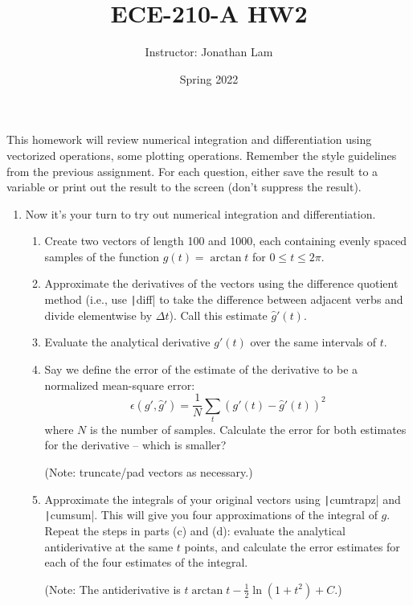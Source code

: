 \documentclass{article}
\title{ECE-210-A HW2}
\author{Instructor: Jonathan Lam}
\date{Spring 2022}
\begin{document}
\maketitle

\noindent This homework will review numerical integration and differentiation using vectorized operations, some plotting operations. Remember the style guidelines from the previous assignment. For each question, either save the result to a variable or print out the result to the screen (don't suppress the result).

\begin{enumerate}
\item
  Now it's your turn to try out numerical integration and differentiation.
  \begin{enumerate}
  \item Create two vectors of length 100 and 1000, each containing evenly spaced samples of the function $g(t)=\arctan t$ for $0\le t\le 2\pi$.
    
  \item Approximate the derivatives of the vectors using the difference quotient method (i.e., use \texttt|diff| to take the difference between adjacent verbs and divide elementwise by $\Delta t$). Call this estimate $\hat{g}'(t)$.
    
  \item Evaluate the analytical derivative $g'(t)$ over the same intervals of $t$.
    
  \item Say we define the error of the estimate of the derivative to be a normalized mean-square error:
    \begin{equation*}
      \epsilon(g',\hat{g}')=\frac{1}{N}\sum_{t} (g'(t)-\hat{g}'(t))^2
    \end{equation*}
    where $N$ is the number of samples. Calculate the error for both estimates for the derivative -- which is smaller?

    (Note: truncate/pad vectors as necessary.)
    
  \item Approximate the integrals of your original vectors using \texttt|cumtrapz| and \texttt|cumsum|. This will give you four approximations of the integral of $g$. Repeat the steps in parts (c) and (d): evaluate the analytical antiderivative at the same $t$ points, and calculate the error estimates for each of the four estimates of the integral.

    (Note: The antiderivative is $t \arctan t-\frac{1}{2}\ln\left(1+t^{2}\right)+C$.)
    

\end{enumerate}
\end{enumerate}
\end{document}
